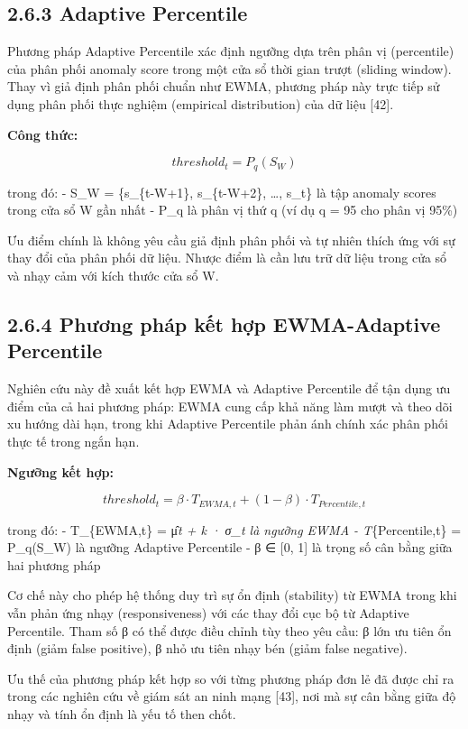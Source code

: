 \documentclass[
  a4paper]{report}
\begin{document}
\subsection{2.6.3 Adaptive Percentile}\label{adaptive-percentile}

Phương pháp Adaptive Percentile xác định ngưỡng dựa trên phân vị
(percentile) của phân phối anomaly score trong một cửa sổ thời gian
trượt (sliding window). Thay vì giả định phân phối chuẩn như EWMA,
phương pháp này trực tiếp sử dụng phân phối thực nghiệm (empirical
distribution) của dữ liệu {[}42{]}.

\textbf{Công thức:}

\[threshold_t = P_q(S_W)\]

trong đó: - S\_W = \{s\_\{t-W+1\}, s\_\{t-W+2\}, \ldots, s\_t\} là tập
anomaly scores trong cửa sổ W gần nhất - P\_q là phân vị thứ q (ví dụ q
= 95 cho phân vị 95\%)

Ưu điểm chính là không yêu cầu giả định phân phối và tự nhiên thích ứng
với sự thay đổi của phân phối dữ liệu. Nhược điểm là cần lưu trữ dữ liệu
trong cửa sổ và nhạy cảm với kích thước cửa sổ W.

\subsection{2.6.4 Phương pháp kết hợp EWMA-Adaptive
Percentile}\label{phux1b0ux1a1ng-phuxe1p-kux1ebft-hux1ee3p-ewma-adaptive-percentile}

Nghiên cứu này đề xuất kết hợp EWMA và Adaptive Percentile để tận dụng
ưu điểm của cả hai phương pháp: EWMA cung cấp khả năng làm mượt và theo
dõi xu hướng dài hạn, trong khi Adaptive Percentile phản ánh chính xác
phân phối thực tế trong ngắn hạn.

\textbf{Ngưỡng kết hợp:}

\[threshold_t = \beta \cdot T_{EWMA,t} + (1 - \beta) \cdot T_{Percentile,t}\]

trong đó: - T\_\{EWMA,t\} = μ̂\emph{t + k · σ\_t là ngưỡng EWMA -
T}\{Percentile,t\} = P\_q(S\_W) là ngưỡng Adaptive Percentile - β ∈
{[}0, 1{]} là trọng số cân bằng giữa hai phương pháp

Cơ chế này cho phép hệ thống duy trì sự ổn định (stability) từ EWMA
trong khi vẫn phản ứng nhạy (responsiveness) với các thay đổi cục bộ từ
Adaptive Percentile. Tham số β có thể được điều chỉnh tùy theo yêu cầu:
β lớn ưu tiên ổn định (giảm false positive), β nhỏ ưu tiên nhạy bén
(giảm false negative).

Ưu thế của phương pháp kết hợp so với từng phương pháp đơn lẻ đã được
chỉ ra trong các nghiên cứu về giám sát an ninh mạng {[}43{]}, nơi mà sự
cân bằng giữa độ nhạy và tính ổn định là yếu tố then chốt.
\end{document}
